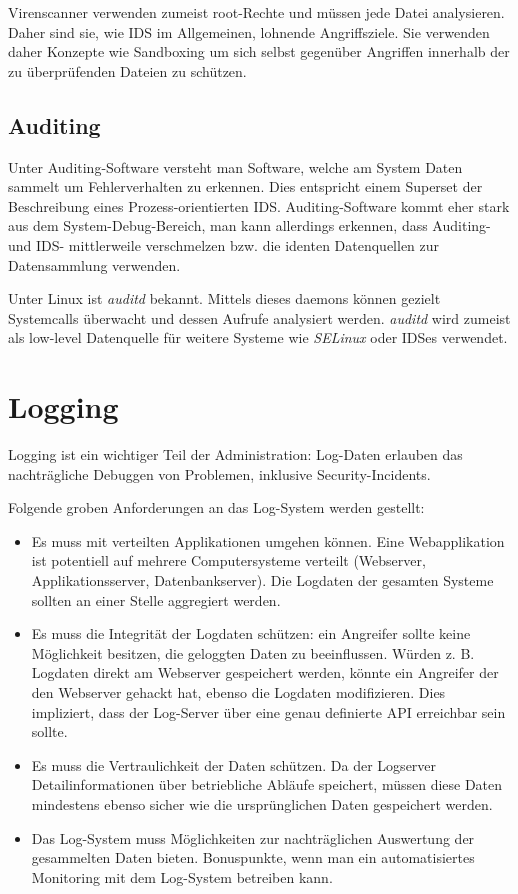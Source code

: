 Virenscanner verwenden zumeist root-Rechte und müssen jede Datei analysieren. Daher sind sie, wie IDS im Allgemeinen, lohnende Angriffsziele. Sie verwenden daher Konzepte wie Sandboxing um sich selbst gegenüber Angriffen innerhalb der zu überprüfenden Dateien zu schützen.

\section{Auditing}

Unter Auditing-Software versteht man Software, welche am System Daten sammelt um Fehlerverhalten zu erkennen. Dies entspricht einem Superset der Beschreibung eines Prozess-orientierten IDS. Auditing-Software kommt eher stark aus dem System-Debug-Bereich, man kann allerdings erkennen, dass Auditing- und IDS- mittlerweile verschmelzen bzw. die identen Datenquellen zur Datensammlung verwenden.

Unter Linux ist \textit{auditd} bekannt. Mittels dieses daemons können gezielt Systemcalls überwacht und dessen Aufrufe analysiert werden. \textit{auditd} wird zumeist als low-level Datenquelle für weitere Systeme wie \textit{SELinux} oder IDSes verwendet.

\chapter{Logging}

Logging ist ein wichtiger Teil der Administration: Log-Daten erlauben das nachträgliche Debuggen von Problemen, inklusive Security-Incidents.

Folgende groben Anforderungen an das Log-System werden gestellt:

\begin{itemize}
	\item Es muss mit verteilten Applikationen umgehen können. Eine Webapplikation ist potentiell auf mehrere Computersysteme verteilt (Webserver, Applikationsserver, Datenbankserver). Die Logdaten der gesamten Systeme sollten an einer Stelle aggregiert werden.
	\item Es muss die Integrität der Logdaten schützen: ein Angreifer sollte keine Möglichkeit besitzen, die geloggten Daten zu beeinflussen. Würden z. B. Logdaten direkt am Webserver gespeichert werden, könnte ein Angreifer der den Webserver gehackt hat, ebenso die Logdaten modifizieren. Dies impliziert, dass der Log-Server über eine genau definierte API erreichbar sein sollte.
	\item Es muss die Vertraulichkeit der Daten schützen. Da der Logserver Detailinformationen über betriebliche Abläufe speichert, müssen diese Daten mindestens ebenso sicher wie die ursprünglichen Daten gespeichert werden.
	\item Das Log-System muss Möglichkeiten zur nachträglichen Auswertung der gesammelten Daten bieten. Bonuspunkte, wenn man ein automatisiertes Monitoring mit dem Log-System betreiben kann.
\end{itemize}

